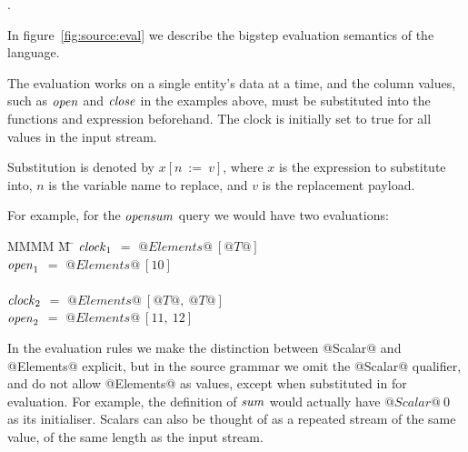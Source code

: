 
.

In figure~\ref{fig:source:eval} we describe the bigstep evaluation semantics of the language.



The evaluation works on a single entity's data at a time, and the column values, such as $\mathit{open}$ and $\mathit{close}$ in the examples above, must be substituted into the functions and expression beforehand. 
The clock is initially set to true for all values in the input stream.

Substitution is denoted by $x[n~:=~v]$, where $x$ is the expression to substitute into, $n$ is the variable name to replace, and $v$ is the replacement payload.

For example, for the $\mathit{opensum}$ query we would have two evaluations:
\begin{tabbing}
MMMM \= M \= \kill
$\mathit{clock}_1$ \> $=$ \> $@Elements@~[@T@]$ \\
$\mathit{open}_1$  \> $=$ \> $@Elements@~[10]$ \\
\\
$\mathit{clock}_2$ \> $=$ \> $@Elements@~[@T@,~@T@]$ \\
$\mathit{open}_2$  \> $=$ \> $@Elements@~[11,~12]$ \\
\end{tabbing}

 

 In the evaluation rules we make the distinction between @Scalar@ and @Elements@ explicit, but in the source grammar we omit the @Scalar@ qualifier, and do not allow @Elements@ as values, except when substituted in for evaluation.
For example, the definition of $\mathit{sum}$ would actually have $@Scalar@~0$ as its initialiser.
Scalars can also be thought of as a repeated stream of the same value, of the same length as the input stream.

